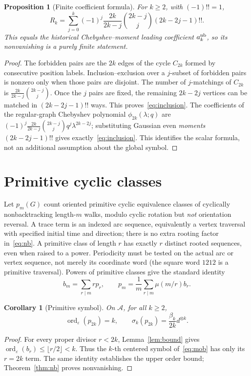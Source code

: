 \documentclass[11pt]{amsart}
\DeclareMathOperator{\ord}{ord}
\newcommand{\eps}{\varepsilon}
\newtheorem{corollary}[theorem]{Corollary}
\newtheorem{proposition}[theorem]{Proposition}
\theoremstyle{definition}
\theoremstyle{remark}
\begin{document}
\begin{proposition}[Finite coefficient formula]\label{prop:finite}
For $k\ge2$, with $(-1)!!=1$,
\begin{equation}\label{eq:inclusion}
R_k=\sum_{j=0}^k(-1)^j
\frac{2k}{2k-j}\binom{2k-j}{j}(2k-2j-1)!!.
\end{equation}
This equals the historical Chebyshev--moment leading coefficient
$a_k^{\rm nb}$, so its nonvanishing is a purely finite statement.
\end{proposition}
\begin{proof}
The forbidden pairs are the $2k$ edges of the cycle $C_{2k}$
formed by consecutive position labels. Inclusion--exclusion over a
$j$-subset of forbidden pairs is nonzero only when those pairs are
disjoint. The number of $j$-matchings of $C_{2k}$ is
$\frac{2k}{2k-j}\binom{2k-j}{j}$. Once the $j$ pairs are fixed, the
remaining $2k-2j$ vertices can be matched in
$(2k-2j-1)!!$ ways. This proves~\eqref{eq:inclusion}.
The coefficients of the regular-graph Chebyshev polynomial
$\phi_{2k}(\lambda;q)$ are
$(-1)^j\frac{2k}{2k-j}\binom{2k-j}{j}q^j\lambda^{2k-2j}$;
substituting Gaussian even \emph{moments} $(2k-2j-1)!!$ gives
exactly~\eqref{eq:inclusion}. This identifies the scalar formula, not
an additional assumption about the global symbol.
\end{proof}

\section{Primitive cyclic classes}
Let $p_m(G)$ count oriented primitive cyclic equivalence classes of
cyclically nonbacktracking length-$m$ walks, modulo cyclic rotation but
\emph{not} orientation reversal. A trace term is an indexed arc sequence, equivalently a vertex traversal
with specified initial time and direction; there is no extra rooting
factor in~\eqref{eq:nb}. A primitive class of length $r$ has exactly $r$
distinct rooted sequences, even when raised to a power. Periodicity must
be tested on the actual arc or vertex sequence, not merely its coordinate
word (the square word $1212$ is a primitive traversal).
Powers of primitive classes give the
standard identity
\begin{equation}\label{eq:mob}
b_m=\sum_{r\mid m}r p_r,
\qquad p_m=\frac1m\sum_{r\mid m}\mu(m/r)b_r.
\end{equation}
\begin{corollary}[Primitive symbol]\label{cor:primitive}
On $\mathcal A$, for all $k\ge2$,
\[
\ord_\eps(p_{2k})=k,\qquad
\sigma_k(p_{2k})=\frac{\beta_k}{2k}d^{\otimes k}.
\]
\end{corollary}
\begin{proof}
For every proper divisor $r<2k$, Lemma~\ref{lem:bound}
gives $\ord_\eps(b_r)\le\lfloor r/2\rfloor<k$.
Thus the $k$-th centered symbol of~\eqref{eq:mob} has only its
$r=2k$ term. The same identity establishes the upper order bound;
Theorem~\ref{thm:nb} proves nonvanishing.
\end{proof}
\end{document}
